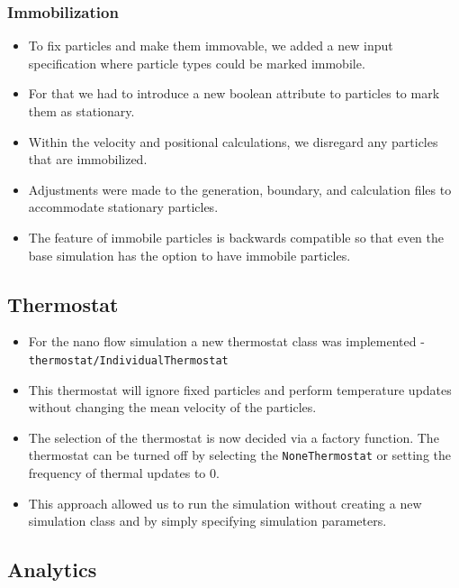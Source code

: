 \documentclass{article}
\begin{document}
    \subsubsection{Immobilization}
    \label{sec:nano:impl:immob}
        \begin{itemize}
            \item To fix particles and make them immovable, we added a new input specification where particle types could be marked immobile.
            \item For that we had to introduce a new boolean attribute to particles to mark them as stationary.
            \item Within the velocity and positional calculations, we disregard any particles that are immobilized.
            \item Adjustments were made to the generation, boundary, and calculation files to accommodate stationary particles.
            \item The feature of immobile particles is backwards compatible so that even the base simulation has the option to have immobile particles.
        \end{itemize}

    \subsection{Thermostat}
    \label{sec:nano:impl:thermo}
        \begin{itemize}
            \item For the nano flow simulation a new thermostat class was implemented - \texttt{thermostat/IndividualThermostat}
            \item This thermostat will ignore fixed particles and perform temperature updates without changing the mean velocity of the particles.
            \item The selection of the thermostat is now decided via a factory function. The thermostat can be turned off by selecting the \texttt{NoneThermostat} or setting the frequency of thermal updates to 0.
            \item This approach allowed us to run the simulation without creating a new simulation class and by simply specifying simulation parameters.
        \end{itemize}


\subsection{Analytics}
\label{sec:nano:ana}
\end{document}
